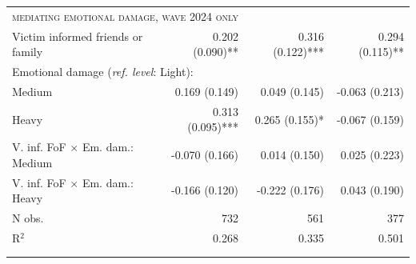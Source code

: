 \begin{tabular}{lrrr}
	\multicolumn{3}{l}{\hspace*{5em}\textsc{mediating emotional damage, wave 2024 only}} \\
	\addlinespace[5pt] 
	Victim informed friends or family &0.202 (0.090)**	&0.316 (0.122)***&	0.294 (0.115)**\\  
	\multicolumn{3}{l}{Emotional damage (\textit{ref. level}: Light):}\\
	\hspace{1em} Medium & 0.169 (0.149) &	0.049 (0.145)	& -0.063 (0.213)\\
	\hspace{1em} Heavy & 0.313 (0.095)*** &	0.265 (0.155)* &	-0.067 (0.159)\\
	V. inf. FoF $\times$ Em. dam.: Medium &	-0.070 (0.166) &	0.014 (0.150) &	0.025 (0.223) \\
	V. inf. FoF $\times$ Em. dam.: Heavy &	-0.166 (0.120) &	-0.222 (0.176) &	0.043 (0.190) \\
	
	\addlinespace[5pt] 
	N obs. &	732	& 561	& 377\\
	R$^2$ &	0.268 &	0.335 &	0.501\\
	\midrule \\
	\addlinespace[-10pt]
\end{tabular}
\par\endgroup